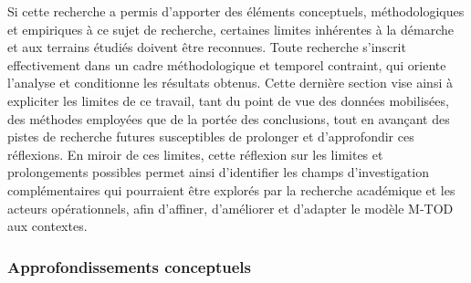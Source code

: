 \begin{refsegment}
Si cette recherche a permis d’apporter des éléments conceptuels, méthodologiques et empiriques à ce sujet de recherche, certaines limites inhérentes à la démarche et aux terrains étudiés doivent être reconnues. Toute recherche s’inscrit effectivement dans un cadre méthodologique et temporel contraint, qui oriente l’analyse et conditionne les résultats obtenus. Cette dernière section vise ainsi à expliciter les limites de ce travail, tant du point de vue des données mobilisées, des méthodes employées que de la portée des conclusions, tout en avançant des pistes de recherche futures susceptibles de prolonger et d’approfondir ces réflexions. En miroir de ces limites, cette réflexion sur les limites et prolongements possibles permet ainsi d’identifier les champs d’investigation complémentaires qui pourraient être explorés par la recherche académique et les acteurs opérationnels, afin d’affiner, d'améliorer et d’adapter le modèle \acrshort{M-TOD} aux contextes.

\subsubsection*{Approfondissements conceptuels
    \label{conclusion-generale:perspectives-pistes-theoriques}
    }


\end{refsegment}

